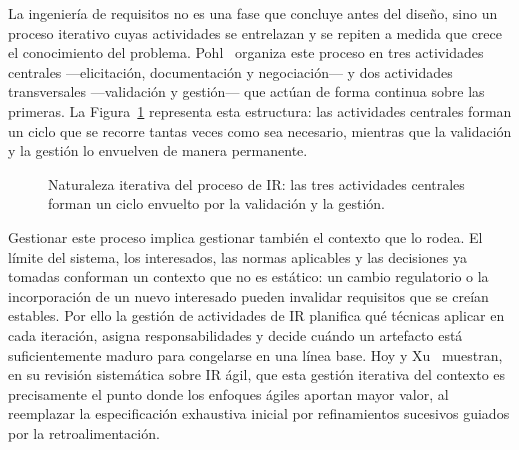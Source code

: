 \documentclass[11pt,a4paper,oneside]{report}
\begin{document}
	La ingenier\'ia de requisitos no es una fase que concluye antes del dise\~no, sino un proceso iterativo cuyas actividades se entrelazan y se repiten a medida que crece el conocimiento del problema. Pohl~\citep{pohl_2010} organiza este proceso en tres actividades centrales ---elicitaci\'on, documentaci\'on y negociaci\'on--- y dos actividades transversales ---validaci\'on y gesti\'on--- que act\'uan de forma continua sobre las primeras. La Figura~\ref{fig:iterativo} representa esta estructura: las actividades centrales forman un ciclo que se recorre tantas veces como sea necesario, mientras que la validaci\'on y la gesti\'on lo envuelven de manera permanente.
	
	\begin{figure}[htbp]
		\centering
		\caption{Naturaleza iterativa del proceso de IR: las tres actividades centrales forman un ciclo envuelto por la validaci\'on y la gesti\'on.}
		\label{fig:iterativo}
	\end{figure}
	
	Gestionar este proceso implica gestionar tambi\'en el contexto que lo rodea. El l\'imite del sistema, los interesados, las normas aplicables y las decisiones ya tomadas conforman un contexto que no es est\'atico: un cambio regulatorio o la incorporaci\'on de un nuevo interesado pueden invalidar requisitos que se cre\'ian estables. Por ello la gesti\'on de actividades de IR planifica qu\'e t\'ecnicas aplicar en cada iteraci\'on, asigna responsabilidades y decide cu\'ando un artefacto est\'a suficientemente maduro para congelarse en una l\'inea base. Hoy y Xu~\citep{hoy_agile_re_2023} muestran, en su revisi\'on sistem\'atica sobre IR \'agil, que esta gesti\'on iterativa del contexto es precisamente el punto donde los enfoques \'agiles aportan mayor valor, al reemplazar la especificaci\'on exhaustiva inicial por refinamientos sucesivos guiados por la retroalimentaci\'on.
	
\end{document}
